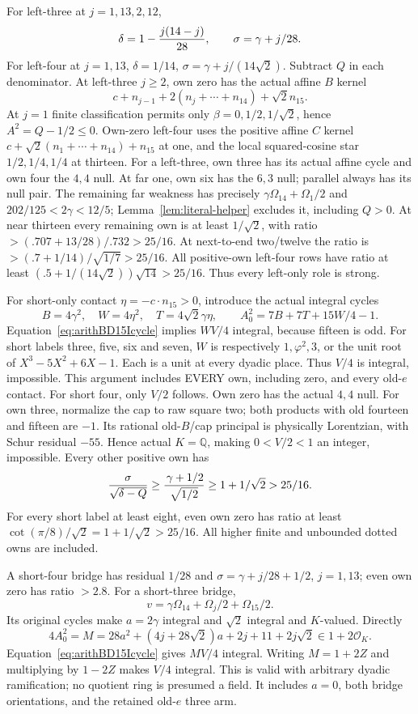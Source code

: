 For left-three at \(j=1,13,2,12\),
\[
              \delta=1-{j(14-j)\over28},\qquad
              \sigma=\gamma+j/28.
\]
For left-four at \(j=1,13\),
\(\delta=1/14\), \(\sigma=\gamma+j/(14\sqrt2)\).
Subtract \(Q\) in each denominator.
At left-three \(j\ge2\), own zero has the actual
affine \(B\) kernel
\[
       c+n_{j-1}+2(n_j+\cdots+n_{14})+\sqrt2n_{15}.
\]
At \(j=1\) finite classification permits only
\(\beta=0,1/2,1/\sqrt2\), hence
\(A^2=Q-1/2\le0\).
Own-zero left-four uses the positive affine \(C\)
kernel
\(c+\sqrt2(n_1+\cdots+n_{14})+n_{15}\) at one,
and the local squared-cosine star
\(1/2,1/4,1/4\) at thirteen.
For a left-three, own three has its actual affine cycle
and own four the \(4,4\) null.
At far one, own six has the \(6,3\) null; parallel
always has its null pair.
The remaining far weakness has precisely
\(\gamma\Omega_{14}+\Omega_1/2\) and
\(202/125<2\gamma<12/5\);
Lemma~\ref{lem:literal-helper} excludes it, including \(Q>0\).
At near thirteen every remaining own is at least
\(1/\sqrt2\), with ratio
\(>(.707+13/28)/.732>25/16\).
At next-to-end two/twelve the ratio is
\(>(.7+1/14)/\sqrt{1/7}>25/16\).
All positive-own left-four rows have ratio at least
\((.5+1/(14\sqrt2))\sqrt{14}>25/16\).
Thus every left-only role is strong.

For short-only contact \(\eta=-c\cdot n_{15}>0\),
introduce the actual integral cycles
\[
 B=4\gamma^2,\quad W=4\eta^2,\quad
 T=4\sqrt2\gamma\eta,\qquad
 A_0^2=7B+7T+15W/4-1.
\]
Equation~\eqref{eq:arithBD15Icycle} implies \(WV/4\)
integral, because fifteen is odd.
For short labels three, five, six and seven,
\(W\) is respectively \(1,\varphi^2,3\), or the unit
root of \(X^3-5X^2+6X-1\).
Each is a unit at every dyadic place.
Thus \(V/4\) is integral, impossible.
This argument includes EVERY own, including zero,
and every old-\(e\) contact.
For short four, only \(V/2\) follows.
Own zero has the actual \(4,4\) null.
For own three, normalize the cap to raw square two;
both products with old fourteen and fifteen are \(-1\).
Its rational old-\(B\)/cap principal is physically
Lorentzian, with Schur residual \(-55\).
Hence actual \(K=\mathbb Q\), making \(0<V/2<1\)
an integer, impossible.
Every other positive own has
\[
 {\sigma\over\sqrt{\delta-Q}}\ge
 {\,\gamma+1/2\over\sqrt{1/2}}\ge1+1/\sqrt2>25/16.
\]
For every short label at least eight, even own zero
has ratio at least
\(\cot(\pi/8)/\sqrt2=1+1/\sqrt2>25/16\).
All higher finite and unbounded dotted owns are included.

A short-four bridge has residual \(1/28\) and
\(\sigma=\gamma+j/28+1/2\), \(j=1,13\);
even own zero has ratio \(>2.8\).
For a short-three bridge,
\[
 v=\gamma\Omega_{14}+\Omega_j/2+\Omega_{15}/2 .
\]
Its original cycles make \(a=2\gamma\) integral
and \(\sqrt2\) integral and \(K\)-valued.
Directly
\[
 4A_0^2=M=28a^2+(4j+28\sqrt2)a+2j+11+2j\sqrt2
             \in1+2\mathcal O_K .
\]
Equation~\eqref{eq:arithBD15Icycle} gives \(MV/4\)
integral.
Writing \(M=1+2Z\) and multiplying by \(1-2Z\)
makes \(V/4\) integral.
This is valid with arbitrary dyadic ramification;
no quotient ring is presumed a field.
It includes \(a=0\), both bridge orientations,
and the retained old-\(e\) three arm.

